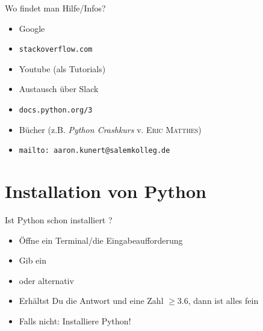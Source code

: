 \begin{frame}
\end{frame}

\begin{frame}
\begin{block}{Wo findet man Hilfe/Infos?}
	\vspace{2pt}
	\begin{itemize}
		\item Google
		\item \texttt{stackoverflow.com}
		\item Youtube (als Tutorials)
		\item Austausch über Slack 
		\item \texttt{docs.python.org/3}
		\item Bücher (z.B. \textit{Python Crashkurs} v. \textsc{Eric Matthes})
		\item \texttt{mailto: aaron.kunert@salemkolleg.de}
	\end{itemize}
\end{block}
\end{frame}


\section{Installation von Python}

\begin{frame}
\begin{block}{Ist Python schon installiert ?}
	\begin{itemize}
		\item Öffne ein Terminal/die Eingabeaufforderung
		\item Gib ein 
		\item oder alternativ 
		\item Erhältst Du die Antwort  und eine Zahl $\geq 3.6$, dann ist alles fein
		\item Falls nicht: Installiere Python!
	\end{itemize}
\end{block}
\end{frame}


